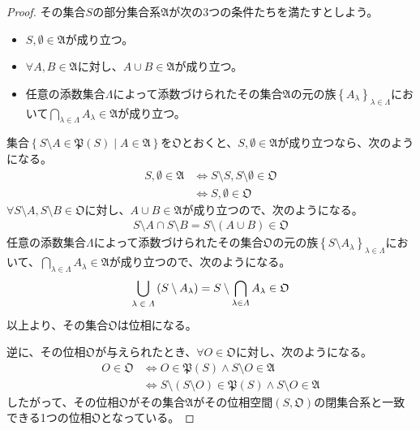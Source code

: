 \documentclass[dvipdfmx]{jsarticle}
\begin{document}
\begin{proof}
その集合$S$の部分集合系$\mathfrak{A}$が次の3つの条件たちを満たすとしよう。
\begin{itemize}
\item
  $S,\emptyset \in \mathfrak{A}$が成り立つ。
\item
  $\forall A,B \in \mathfrak{A}$に対し、$A \cup B \in \mathfrak{A}$が成り立つ。
\item
  任意の添数集合$\varLambda$によって添数づけられたその集合$\mathfrak{A}$の元の族$\left\{ A_{\lambda} \right\}_{\lambda \in \varLambda}$において$\bigcap_{\lambda \in \varLambda} A_{\lambda}\in \mathfrak{A}$が成り立つ。
\end{itemize}
集合$\left\{ S \setminus A \in \mathfrak{P}(S) \middle| A \in \mathfrak{A} \right\}$を$\mathfrak{O}$とおくと、$S,\emptyset \in \mathfrak{A}$が成り立つなら、次のようになる。
\begin{align*}
S,\emptyset \in \mathfrak{A} &\Leftrightarrow S \setminus S,S \setminus \emptyset \in \mathfrak{O}\\
&\Leftrightarrow S,\emptyset \in \mathfrak{O}
\end{align*}
$\forall S \setminus A,S \setminus B \in \mathfrak{O}$に対し、$A \cup B \in \mathfrak{A}$が成り立つので、次のようになる。
\begin{align*}
S \setminus A \cap S \setminus B = S \setminus (A \cup B)\in \mathfrak{O}
\end{align*}
任意の添数集合$\varLambda$によって添数づけられたその集合$\mathfrak{O}$の元の族$\left\{ S \setminus A_{\lambda} \right\}_{\lambda \in \varLambda}$において、$\bigcap_{\lambda \in \varLambda} A_{\lambda}\in \mathfrak{A}$が成り立つので、次のようになる。
\begin{align*}
\bigcup_{\scriptsize \begin{matrix}
\lambda \in \varLambda \\
\end{matrix}} \left( S \setminus A_{\lambda} \right) = S \setminus \bigcap_{\lambda \in \varLambda} A_{\lambda}\in \mathfrak{O}
\end{align*}
以上より、その集合$\mathfrak{O}$は位相になる。\par
逆に、その位相$\mathfrak{O}$が与えられたとき、$\forall O \in \mathfrak{O}$に対し、次のようになる。
\begin{align*}
O \in \mathfrak{O} &\Leftrightarrow O \in \mathfrak{P}(S) \land S \setminus O \in \mathfrak{A}\\
&\Leftrightarrow S \setminus (S \setminus O)\in \mathfrak{P}(S) \land S \setminus O \in \mathfrak{A}
\end{align*}
したがって、その位相$\mathfrak{O}$がその集合$\mathfrak{A}$がその位相空間$\left( S,\mathfrak{O} \right)$の閉集合系と一致できる1つの位相$\mathfrak{O}$となっている。
\end{proof}
\end{document}

